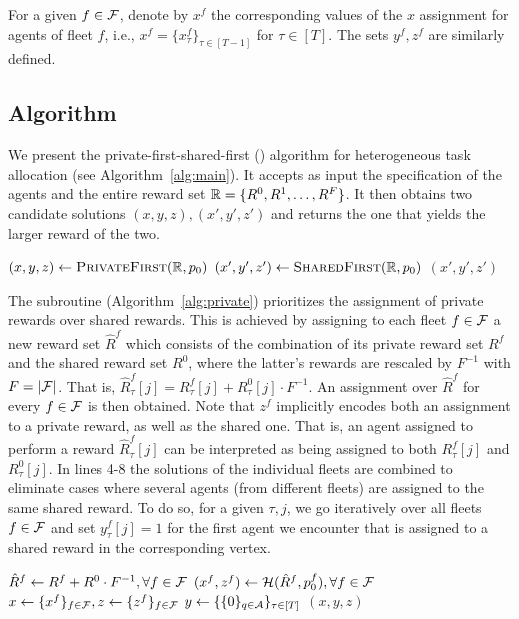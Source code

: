 \documentclass[conference]{IEEEtran}
\begin{document}
For a given $f\in \mathcal{F}$, denote by $x^f$ the corresponding values of the $x$ assignment for agents of fleet $f$, i.e., $x^f=\{x^f_{\tau}\}_{\tau\in [T-1]}$ for $\tau \in [T]$. The sets $y^f,z^f$ are similarly defined. 

\subsection{Algorithm}
We present the private-first-shared-first (\alg) algorithm for heterogeneous task allocation (see  Algorithm~\ref{alg:main}). It accepts as input the specification of the agents and the entire reward set $\mathbb{R}=\{R^0,R^1,\ldots,R^F\}$. It then obtains two candidate solutions $(x,y,z),(x',y',z')$ and returns the one that yields the larger reward of the two. 

\begin{algorithm}[!ht]
  $(x,y,z)\gets \textsc{PrivateFirst}(\mathbb{R},p_0)$\;
  $(x',y',z')\gets \textsc{SharedFirst}(\mathbb{R},p_0)$\;
  \Return $(x',y',z')$\;
  \caption{\alg$(\dR,p_0)$}
  \label{alg:main}
\end{algorithm} 

The subroutine \private (Algorithm~\ref{alg:private}) prioritizes the assignment of private rewards over shared rewards. This is achieved by assigning to each fleet $f\in \mathcal{F}$ a new reward set $\hat{R}^f$ which consists of the combination of its private reward set $R^f$ and the shared reward set $R^0$, where the latter's rewards are rescaled by $F^{-1}$ with $F=|\mathcal{F}|$. That is, $\hat{R}^f_\tau[j]={R}^f_\tau[j]+ {R}^0_\tau[j]\cdot F^{-1}$. An assignment over $\hat{R}^f$ for every $f\in \mathcal{F}$ is then obtained. Note that $z^f$ implicitly encodes both an assignment to a private reward, as well as the shared one. That is, an agent assigned to perform a reward $\hat{R}^f_\tau[j]$ can be interpreted as being assigned to both $R^f_\tau[j]$ and $R^0_\tau[j]$.
In lines 4-8 the solutions of the individual fleets are combined to eliminate cases where several agents (from different fleets) are assigned to the same shared reward. To do so, for a given $\tau,j$, we go iteratively over all fleets $f\in \mathcal{F}$ and set $y^f_\tau[j]=1$ for the first agent we encounter that is assigned to a shared reward in the corresponding vertex. 

\begin{algorithm}[!ht]
  $\hat{R}^f\gets R^f+R^0\cdot F^{-1}, \forall f\in \mathcal{F}$\;
  $(x^f,z^f)\gets \mathcal{H}(\hat{R}^f,p_0^f), \forall f\in \mathcal{F}$\;
  $x\gets \{x^f\}_{f\in \mathcal{F}},z\gets\{z^f\}_{f\in \mathcal{F}}$\;
  $y\gets \{\{0\}_{q\in \mathcal{A}}\}_{\tau \in [T]}$\;
  \Return $(x,y,z)$\;
  \caption{$\private(\dR,p_0)$}
  \label{alg:private}
\end{algorithm} 
\end{document}
